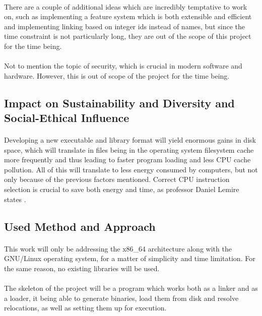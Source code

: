 \documentclass[12pt]{article}
\begin{document}
	\paragraph{} There are a couple of additional ideas which are incredibly temptative to work on, such as implementing a feature system which is both extensible and efficient and implementing linking based on integer ids instead of names, but since the time constraint is not particularly long, they are out of the scope of this project for the time being.
	\paragraph{}Not to mention the topic of security, which is crucial in modern software and hardware. However, this is out of scope of the project for the time being.
	\subsection{Impact on Sustainability and Diversity and Social-Ethical Influence}
    \paragraph{} Developing a new executable and library format will yield enormous gains in disk space, which will translate in files being in the operating system filesystem cache more frequently and thus leading to faster program loading and less CPU cache pollution. All of this will translate to less energy consumed by computers, but not only because of the previous factors mentioned. Correct CPU instruction selection is crucial to save both energy and time, as professor Daniel Lemire states \cite{lemire-energy}. 
	\subsection{Used Method and Approach}
	\paragraph{}This work will only be addressing the x86\_64 architecture along with the GNU/Linux operating system, for a matter of simplicity and time limitation. For the same reason, no existing libraries will be used.
    
    \paragraph{}The skeleton of the project will be a program which works both as a linker and as a loader, it being able to generate binaries, load them from disk and resolve relocations, as well as setting them up for execution.
    
\end{document}
